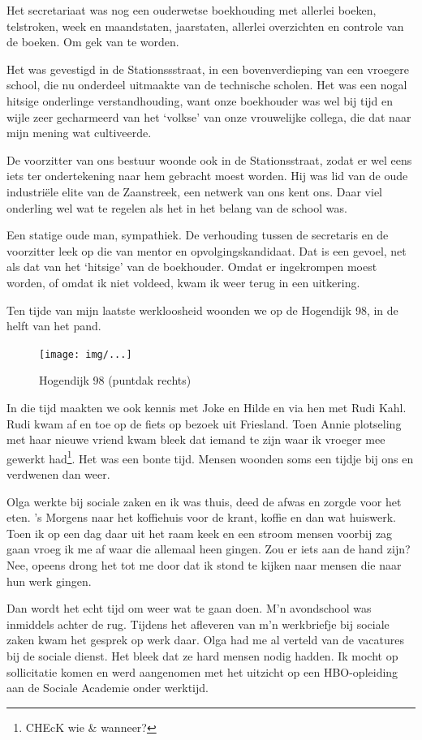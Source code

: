 \documentclass[12pt,twoside, openright]{memoir}
\begin{document}
Het secretariaat was nog een ouderwetse boekhouding met allerlei boeken, telstroken, week en maandstaten, jaarstaten, allerlei overzichten en controle van de boeken. Om gek van te worden. 

Het was gevestigd in de Stationssstraat, in een bovenverdieping van een vroegere school, die nu onderdeel uitmaakte van de technische scholen. Het was een nogal hitsige onderlinge verstandhouding, want onze boekhouder was wel bij tijd en wijle zeer gecharmeerd van het `volkse' van onze vrouwelijke collega, die dat naar mijn mening wat cultiveerde. 

De voorzitter van ons bestuur woonde ook in de Stationsstraat, zodat er wel eens iets ter ondertekening naar hem gebracht moest worden. Hij was lid van de oude industriële elite van de Zaanstreek, een netwerk van ons kent ons. Daar viel onderling wel wat te regelen als het in het belang van de school was. 

Een statige oude man, sympathiek. De verhouding tussen de secretaris en de voorzitter leek op die van mentor en opvolgingskandidaat. Dat is een gevoel, net als dat van het `hitsige' van de boekhouder. Omdat er ingekrompen moest worden, of omdat ik niet voldeed, kwam ik weer terug in een uitkering.

Ten tijde van mijn laatste werkloosheid woonden we op de Hogendijk 98, in de helft van het pand.

\begin{figure}[t]
\texttt{[image: img/...]}
\caption{Hogendijk 98 (puntdak rechts)}
\end{figure}

In die tijd maakten we ook kennis met Joke en Hilde en via hen met Rudi Kahl. Rudi kwam af en toe op de fiets op bezoek uit Friesland. Toen Annie plotseling met haar nieuwe vriend kwam bleek dat iemand te zijn waar ik vroeger mee gewerkt had\footnote{CHEcK wie & wanneer?}. Het was een bonte tijd. Mensen woonden soms een tijdje bij ons en verdwenen dan weer. 

Olga werkte bij sociale zaken en ik was thuis, deed de afwas en zorgde voor het eten. 's Morgens naar het koffiehuis voor de krant, koffie en dan wat huiswerk. Toen ik op een dag daar uit het raam keek en een stroom mensen voorbij zag gaan vroeg ik  me af waar die allemaal heen gingen. Zou er iets aan de hand zijn? Nee, opeens drong het tot me door dat ik stond te kijken naar mensen die naar hun werk gingen. 

Dan wordt het echt tijd om weer wat te gaan doen. M'n avondschool was inmiddels achter de rug. Tijdens het afleveren van m'n werkbriefje bij sociale zaken kwam het gesprek op werk daar. Olga had me al verteld van de vacatures bij de sociale dienst. Het bleek dat ze hard mensen nodig hadden. Ik mocht op sollicitatie komen en werd aangenomen met het uitzicht op een HBO-opleiding aan de Sociale Academie onder werktijd. 
\end{document}
